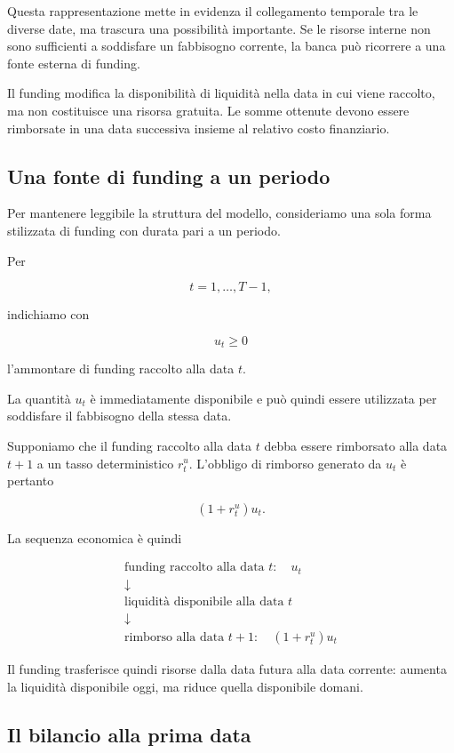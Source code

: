 Questa rappresentazione mette in evidenza il collegamento temporale tra le
diverse date, ma trascura una possibilit\`a importante. Se le risorse interne
non sono sufficienti a soddisfare un fabbisogno corrente, la banca pu\`o
ricorrere a una fonte esterna di funding.

Il funding modifica la disponibilit\`a di liquidit\`a nella data in cui viene
raccolto, ma non costituisce una risorsa gratuita. Le somme ottenute devono
essere rimborsate in una data successiva insieme al relativo costo
finanziario.

\subsection{Una fonte di funding a un periodo}

Per mantenere leggibile la struttura del modello, consideriamo una sola forma
stilizzata di funding con durata pari a un periodo.

Per

\[
t=1,\ldots,T-1,
\]

\noindent indichiamo con

\[
u_t\geq0
\]

\noindent l'ammontare di funding raccolto alla data $t$.

La quantit\`a $u_t$ \`e immediatamente disponibile e pu\`o quindi essere
utilizzata per soddisfare il fabbisogno della stessa data.

Supponiamo che il funding raccolto alla data $t$ debba essere rimborsato alla
data $t+1$ a un tasso deterministico $r^u_t$. L'obbligo di rimborso generato
da $u_t$ \`e pertanto

\[
(1+r^u_t)u_t.
\]

La sequenza economica \`e quindi

\[
\boxed{
\begin{array}{c}
\text{funding raccolto alla data }t:\quad u_t\\[3pt]
\downarrow\\[3pt]
\text{liquidit\`a disponibile alla data }t\\[3pt]
\downarrow\\[3pt]
\text{rimborso alla data }t+1:\quad (1+r^u_t)u_t
\end{array}
}
\]

Il funding trasferisce quindi risorse dalla data futura alla data corrente:
aumenta la liquidit\`a disponibile oggi, ma riduce quella disponibile domani.

\subsection{Il bilancio alla prima data}

